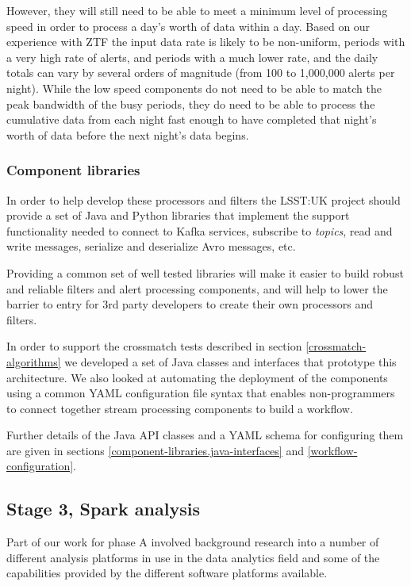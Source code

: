 \documentclass{article}
\newcommand{\yaml} {YAML\xspace}
\newcommand{\avro} {Avro\xspace}
\newcommand{\kafka} {Kafka\xspace}
\newcommand{\kftopics} {\textit{topics}\xspace}
\newcommand{\crossmatch} {crossmatch\xspace}
\newcommand{\serz}      {serialize\xspace}
\newcommand{\deserz}    {deserialize\xspace}
\newcommand{\phasea} {phase A\xspace}
\newcommand{\ztf} {ZTF\xspace}
\newcommand{\lsstuk} {LSST:UK\xspace}
\begin{document}
However, they will still need to be able to meet a minimum level of processing speed in order to process a day's worth of data within a day. Based on our experience with \ztf the input data rate is likely to be non-uniform, periods with a very high rate of alerts, and periods with a much lower rate, and the daily totals can vary by several orders of magnitude (from 100 to 1,000,000 alerts per night).
While the low speed components do not need to be able to match the peak bandwidth of the busy periods, they do need to be able to process the cumulative data from each night fast enough to have completed that night's worth of data before the next night's data begins.

\subsubsection{Component libraries}
\label{stage-2.component-libraries}

In order to help develop these processors and filters the \lsstuk project should provide a set of Java and Python libraries that implement the support functionality needed to connect to \kafka services, subscribe to \kftopics, read and write messages, \serz and \deserz \avro messages, etc.

Providing a common set of well tested libraries will make it easier to build robust and reliable filters and alert processing components, and  will help to lower the barrier to entry for 3rd party developers to create their own processors and filters.

In order to support the \crossmatch tests described in section \ref{crossmatch-algorithms} we developed a set of Java classes and interfaces that prototype this architecture.
We also looked at automating the deployment of the components using a common \yaml configuration file syntax that enables non-programmers to connect together stream processing components to build a workflow.

Further details of the Java API classes and a YAML schema for configuring them are given in sections \ref{component-libraries.java-interfaces} and \ref{workflow-configuration}.

\subsection{Stage 3, Spark analysis}
\label{stage-3}

Part of our work for \phasea involved background research into a number of different analysis platforms in use in the data analytics field and some of the capabilities provided by the different software platforms available.
\end{document}
